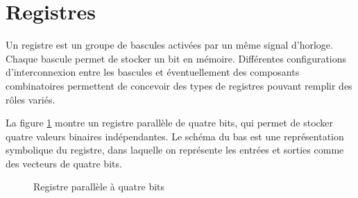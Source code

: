\documentclass[letter, oneside]{book}
\begin{document}
\section{Registres}
\label{sec:org9a2b401}

Un registre est un groupe de bascules activées par un même signal
d'horloge. Chaque bascule permet de stocker un bit en
mémoire. Différentes configurations d'interconnexion entre les
bascules et éventuellement des composants combinatoires permettent de
concevoir des types de registres pouvant remplir des rôles variés.

La figure \ref{fig:org044e528} montre un registre parallèle de quatre bits,
qui permet de stocker quatre valeurs binaires indépendantes. Le schéma
du bas est une représentation symbolique du registre, dans laquelle on
représente les entrées et sorties comme des vecteurs de quatre bits.

\begin{figure}[htbp]
\centering

\caption{\label{fig:org044e528}Registre parallèle à quatre bits}
\end{figure}
\end{document}
